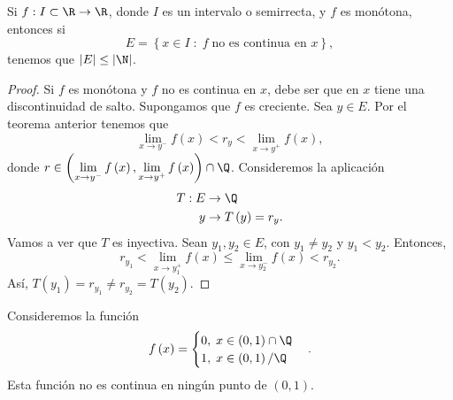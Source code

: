 \begin{ftheorem}[]
\normalfont Si $\displaystyle f : I \subset \R \to \R $, donde $\displaystyle I $ es un intervalo o semirrecta, y $\displaystyle f $ es monótona, entonces si
\[E = \left\{ x \in I \; : \; f \; \text{no es continua en } x\right\}  , \]
tenemos que $\displaystyle \left|E\right| \leq \left|\N\right| $.
\end{ftheorem}
\begin{proof}
Si $\displaystyle f $ es monótona y $\displaystyle f $ no es continua en $\displaystyle x $, debe ser que en $\displaystyle x $ tiene una discontinuidad de salto. Supongamos que $\displaystyle f $ es creciente. Sea $\displaystyle y \in E $. Por el teorema anterior tenemos que 
\[\lim_{x \to y^{-}}f\left(x\right) < r_{y} < \lim_{x \to y^{+}}f\left(x\right) , \]
donde $\displaystyle r \in \left(\lim_{x \to y^{-}}f\left(x\right), \lim_{x \to y^{+}}f\left(x\right)\right) \cap \Q $. Consideremos la aplicación 
\[
\begin{split}
	T: E & \to \Q \\
	y & \to T\left(y\right) = r_{y}.
\end{split}
\]
Vamos a ver que $\displaystyle T $ es inyectiva. Sean $\displaystyle y_{1}, y_{2} \in E $, con $\displaystyle y_{1} \neq y_{2} $ y $\displaystyle y_{1} < y_{2} $. Entonces, 
\[r_{y_{1}}<\lim_{x \to y_{1}^{+}}f\left(x\right) \leq \lim_{x \to y_{2}^{-}}f\left(x\right) < r_{y_{2}} .\]
Así, $\displaystyle T\left(y_{1}\right) = r_{y_{1}} \neq r_{y_{2}} = T\left(y_{2}\right) $.
\end{proof}
\begin{eg}
\normalfont Consideremos la función
\[f\left(x\right) = 
\begin{cases}
0, \; x \in \left(0,1\right) \cap \Q \\
1, \; x \in \left(0,1\right) / \Q
\end{cases}
.\]
Esta función no es continua en ningún punto de $\displaystyle \left(0,1\right) $.
\end{eg}
